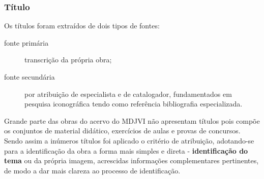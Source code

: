\subsubsection{Título}
Os títulos foram extraídos de dois tipos de fontes: 
\begin{description}
	\item[fonte primária ] transcrição da própria obra;  
	\item[fonte secundária] por atribuição de especialista e de catalogador, fundamentados em pesquisa iconográfica tendo como referência bibliografia especializada.
\end{description}

Grande parte das obras do acervo do MDJVI não apresentam títulos pois compõe os conjuntos de material didático, exercícios de aulas e provas de concursos. Sendo assim a inúmeros títulos foi aplicado o critério de atribuição, adotando-se para a identificação da obra a forma mais simples e direta - \textbf{identificação do tema} ou da própria imagem, acrescidas informações complementares pertinentes, de modo a dar mais clareza ao processo de identificação.

